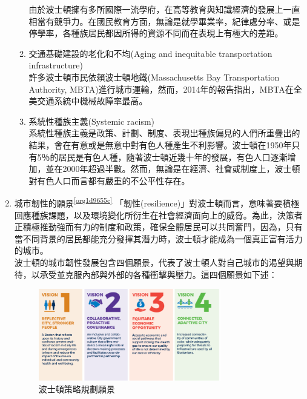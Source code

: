 \documentclass[a4paper,12pt]{article}
\begin{document}
\begin{enumerate}
\begin{enumerate}
由於波士頓擁有多所國際一流學府，在高等教育與知識經濟的發展上一直相當有競爭力。在國民教育方面，無論是就學畢業率，紀律處分率、或是停學率，各種族居民都因所得的資源不同而在表現上有極大的差距。\\
\item 交通基礎建設的老化和不均(Aging and inequitable transportation infrastructure)\\
許多波士頓市民依賴波士頓地鐵(Massachusetts Bay Transportation Authority, MBTA)進行城市運輸，然而，2014年的報告指出，MBTA在全美交通系統中機械故障率最高。\\
\item 系統性種族主義(Systemic racism)\\
系統性種族主義是政策、計劃、制度、表現出種族偏見的人們所重疊出的結果，會在有意或是無意中對有色人種產生不利影響。波士頓在1950年只有5％的居民是有色人種，隨著波士頓近幾十年的發展，有色人口逐漸增加，並在2000年超過半數。然而，無論是在經濟、社會或制度上，波士頓對有色人口而言都有嚴重的不公平性存在。\\
\end{enumerate}

\item 城市韌性的願景\textsuperscript{\ref{org1d9655c}}
\label{sec:org300e95c}
「韌性(resilience)」對波士頓而言，意味著要積極回應種族課題，以及環境變化所衍生在社會經濟面向上的威脅。為此，決策者正積極推動強而有力的制度和政策，確保全體居民可以共同奮鬥，因為，只有當不同背景的居民都能充分發揮其潛力時，波士頓才能成為一個真正富有活力的城市。\\

波士頓的城市韌性發展包含四個願景，代表了波士頓人對自己城市的渴望與期待，以承受並克服內部與外部的各種衝擊與壓力。這四個願景如下述：\\
\begin{figure}[htbp]
\centering
\includegraphics[width=300]{images/49132357_938728969849329_1147817099184308224_n.png}
\caption{\label{fig:FigName}波士頓策略規劃願景}
\end{figure}


\end{enumerate}
\end{document}
